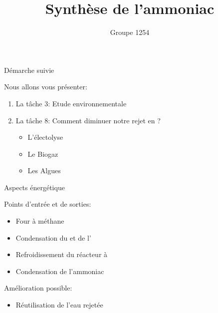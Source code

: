 \documentclass{beamer}
\begin{document}
\title{Synthèse de l'ammoniac}
\author{Groupe 1254}
\date{}
\maketitle
\begin{frame}{Démarche suivie}
\begin{center}
Nous allons vous présenter:
	\begin{enumerate}
	\item La tâche 3: Etude environnementale
	\item La tâche 8: Comment diminuer notre rejet en  ?
		\begin{itemize}
		\item L'électolyse
		\item Le Biogaz
		\item Les Algues
		\end{itemize}
	\end{enumerate}
\end{center}
\end{frame}

\begin{frame}{Aspects énergétique}
\begin{center}
Points d'entrée et de sorties:
\begin{itemize}
\item Four à méthane
\item Condensation du  et de l'
\item Refroidissement du réacteur à 
\item Condensation de l'ammoniac
\end{itemize}

Amélioration possible:
\begin{itemize}
\item Réutilisation de l'eau rejetée
\end{itemize}
\end{center}
\end{frame}
\end{document}
